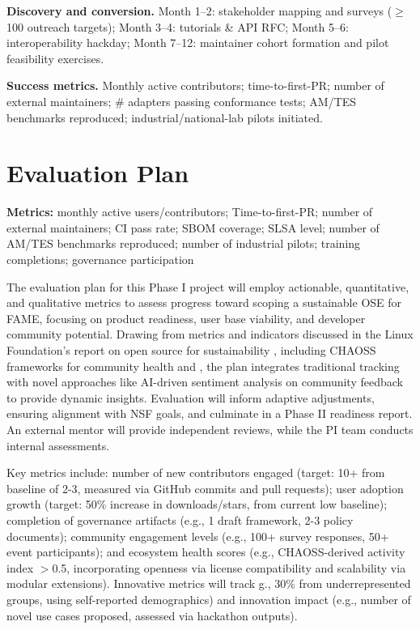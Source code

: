 \documentclass[11pt]{article}
\begin{document}
\noindent
\textbf{Discovery and conversion.} Month 1--2: stakeholder mapping and surveys ($\geq$100 outreach targets); Month 3--4: tutorials \& API RFC; Month 5--6: interoperability hackday; Month 7--12: maintainer cohort formation and pilot feasibility exercises.\vspace{4pt}

\noindent
\textbf{Success metrics.} Monthly active contributors; time-to-first-PR; number of external maintainers; \# adapters passing conformance tests; AM/TES benchmarks reproduced; industrial/national-lab pilots initiated.
\section*{Evaluation Plan}
\vspace{-3pt}
\noindent\textbf{Metrics:} monthly active users/contributors; Time-to-first-PR; number of external maintainers; CI pass rate; SBOM coverage; SLSA level; number of AM/TES benchmarks reproduced; number of industrial pilots; training completions; governance participation 

\vspace{-3pt}
\noindent
The evaluation plan for this Phase I project will employ actionable, quantitative, and qualitative metrics to assess progress toward scoping a sustainable OSE for FAME, focusing on product readiness, user base viability, and developer community potential. Drawing from metrics and indicators discussed in the Linux Foundation's report on open source for sustainability \cite{KBMetricsMetrics,MeasuringYourOpen01,OpenSourceMetrics2025}, including CHAOSS frameworks for community health and , the plan integrates traditional tracking with novel approaches like AI-driven sentiment analysis on community feedback to provide dynamic insights. Evaluation will inform adaptive adjustments, ensuring alignment with NSF goals, and culminate in a Phase II readiness report. An external mentor will provide independent reviews, while the PI team conducts internal assessments.

Key metrics include: number of new contributors engaged (target: 10+ from baseline of 2-3, measured via GitHub commits and pull requests); user adoption growth (target: 50\% increase in downloads/stars, from current low baseline); completion of governance artifacts (e.g., 1 draft framework, 2-3 policy documents); community engagement levels (e.g., 100+ survey responses, 50+ event participants); and ecosystem health scores (e.g., CHAOSS-derived activity index $>$0.5, incorporating openness via license compatibility and scalability via modular extensions). Innovative metrics will track g., 30\% from underrepresented groups, using self-reported demographics) and innovation impact (e.g., number of novel use cases proposed, assessed via hackathon outputs).
\end{document}
